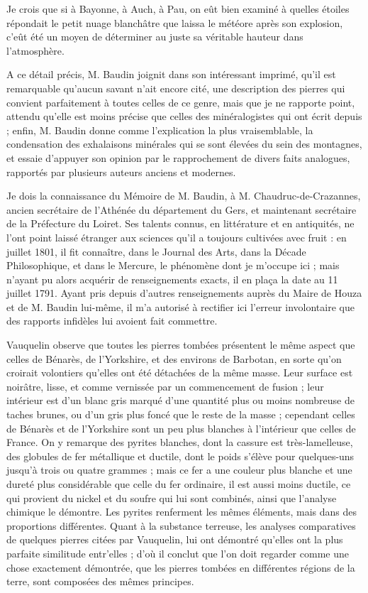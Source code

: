 \documentclass[a4paper, 12pt, oneside, french]{article}
\begin{document}
\og Je crois que si à Bayonne, à Auch, à Pau, on eût bien examiné à quelles étoiles répondait le petit nuage blanchâtre que laissa le météore après son explosion, c'eût été un moyen de déterminer au juste sa véritable hauteur dans l'atmosphère. \fg

A ce détail précis, M. Baudin joignit dans son intéressant imprimé, qu'il est remarquable qu'aucun savant n'ait encore cité, une description des pierres qui convient parfaitement à toutes celles de ce genre, mais que je ne rapporte point, attendu qu'elle est moins précise que celles des minéralogistes qui ont écrit depuis ; enfin, M. Baudin donne comme l'explication la plus vraisemblable, la condensation des exhalaisons minérales qui se sont élevées du sein des montagnes, et essaie d'appuyer son opinion par le rapprochement de divers faits analogues, rapportés par plusieurs auteurs anciens et modernes.

Je dois la connaissance du Mémoire de M. Baudin, à M. Chaudruc-de-Crazannes, ancien secrétaire de l'Athénée du département du Gers, et maintenant secrétaire de la Préfecture du Loiret. Ses talents connus, en littérature et en antiquités, ne l'ont point laissé étranger aux sciences qu'il a toujours cultivées avec fruit : en juillet 1801, il fit connaître, dans le Journal des Arts, dans la Décade Philosophique, et dans le Mercure, le phénomène dont je m'occupe ici ; mais n'ayant pu alors acquérir de renseignements exacts, il en plaça la date au 11 juillet 1791. Ayant pris depuis d'autres renseignements auprès du Maire de Houza et de M. Baudin lui-même, il m'a autorisé à rectifier ici l'erreur involontaire que des rapports infidèles lui avoient fait commettre.

Vauquelin observe que toutes les pierres tombées présentent le même aspect que celles de Bénarès, de l'Yorkshire, et des environs de Barbotan, en sorte qu'on croirait volontiers qu'elles ont été détachées de la même masse. Leur surface est noirâtre, lisse, et comme vernissée par un commencement de fusion ; leur intérieur est d'un blanc gris marqué d'une quantité plus ou moins nombreuse de taches brunes, ou d'un gris plus foncé que le reste de la masse ; cependant celles de Bénarès et de l'Yorkshire sont un peu plus blanches à l'intérieur que celles de France. On y remarque des pyrites blanches, dont la cassure est très-lamelleuse, des globules de fer métallique et ductile, dont le poids s'élève pour quelques-uns jusqu'à trois ou quatre grammes ; mais ce fer a une couleur plus blanche et une dureté plus considérable que celle du fer ordinaire, il est aussi moins ductile, ce qui provient du nickel et du soufre qui lui sont combinés, ainsi que l'analyse chimique le démontre. Les pyrites renferment les mêmes éléments, mais dans des proportions différentes. Quant à la substance terreuse, les analyses comparatives de quelques pierres citées par Vauquelin, lui ont démontré qu'elles ont la plus parfaite similitude entr'elles ; d'où il conclut que l'on doit regarder comme une chose exactement démontrée, que les pierres tombées en différentes régions de la terre, sont composées des mêmes principes.
\end{document}
